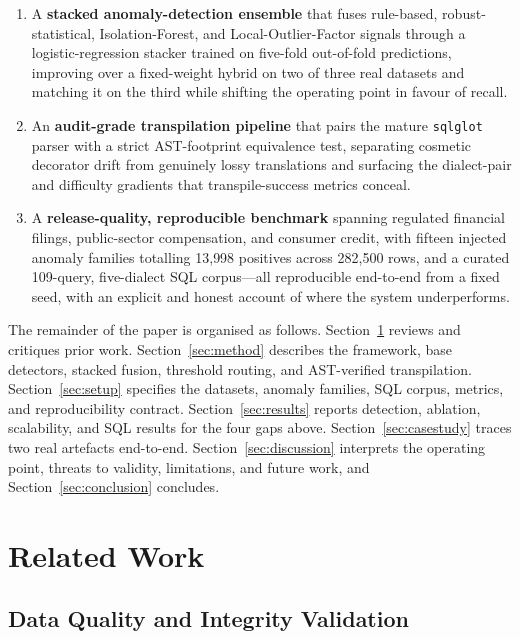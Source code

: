 \documentclass{ieeeaccess}
\begin{document}
\begin{enumerate}
\item A \textbf{stacked anomaly-detection ensemble} that fuses rule-based,
  robust-statistical, Isolation-Forest, and Local-Outlier-Factor signals through
  a logistic-regression stacker trained on five-fold out-of-fold predictions,
  improving over a fixed-weight hybrid on two of three real datasets and matching
  it on the third while shifting the operating point in favour of recall.
\item An \textbf{audit-grade transpilation pipeline} that pairs the mature
  \texttt{sqlglot} parser with a strict AST-footprint equivalence test,
  separating cosmetic decorator drift from genuinely lossy translations and
  surfacing the dialect-pair and difficulty gradients that transpile-success
  metrics conceal.
\item A \textbf{release-quality, reproducible benchmark} spanning regulated
  financial filings, public-sector compensation, and consumer credit, with
  fifteen injected anomaly families totalling 13{,}998 positives across 282{,}500
  rows, and a curated 109-query, five-dialect SQL corpus---all reproducible
  end-to-end from a fixed seed, with an explicit and honest account of where the
  system underperforms.
\end{enumerate}

The remainder of the paper is organised as follows.
Section~\ref{sec:related} reviews and critiques prior work.
Section~\ref{sec:method} describes the framework, base detectors, stacked fusion,
threshold routing, and AST-verified transpilation.
Section~\ref{sec:setup} specifies the datasets, anomaly families, SQL corpus,
metrics, and reproducibility contract.
Section~\ref{sec:results} reports detection, ablation, scalability, and SQL
results for the four gaps above.
Section~\ref{sec:casestudy} traces two real artefacts end-to-end.
Section~\ref{sec:discussion} interprets the operating point, threats to validity,
limitations, and future work, and Section~\ref{sec:conclusion} concludes.

\section{Related Work}
\label{sec:related}

\subsection{Data Quality and Integrity Validation}
\end{document}
